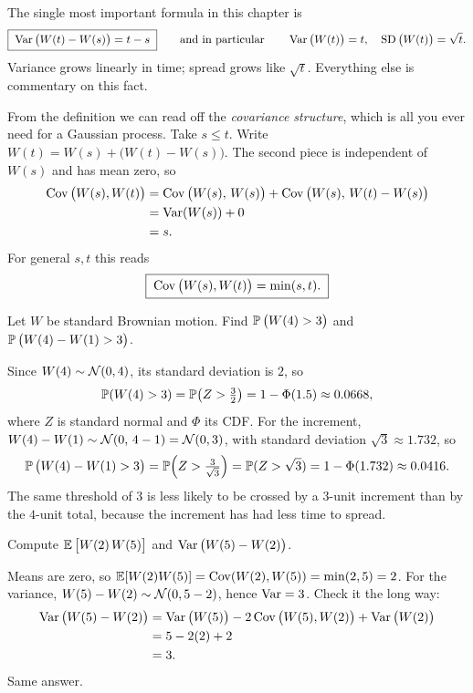 \begin{focusbox}
The single most important formula in this chapter is
\[
  \boxed{\;\Var\big(W(t)-W(s)\big) = t-s\;}\qquad\text{and in particular}\qquad
  \Var\big(W(t)\big) = t,\quad \SD\big(W(t)\big)=\sqrt t.
\]
Variance grows linearly in time; spread grows like $\sqrt t$. Everything else is
commentary on this fact.
\end{focusbox}

From the definition we can read off the \emph{covariance structure}, which is all
you ever need for a Gaussian process. Take $s\le t$. Write $W(t) = W(s) +
\big(W(t)-W(s)\big)$. The second piece is independent of $W(s)$ and has mean
zero, so
\begin{align*}
  \Cov\big(W(s),W(t)\big)
  &= \Cov\big(W(s),\,W(s)\big) + \Cov\big(W(s),\,W(t)-W(s)\big) \\
  &= \Var(W(s)) + 0 \\
  &= s.
\end{align*}
For general $s,t$ this reads
\[
  \boxed{\;\Cov\big(W(s),W(t)\big) = \min(s,t).\;}
\]

\begin{example}
\label{ch29:ex-increments}
Let $W$ be standard Brownian motion. Find $\P\big(W(4) > 3\big)$ and
$\P\big(W(4) - W(1) > 3\big)$.

Since $W(4)\sim\Normal(0,4)$, its standard deviation is $2$, so
\[
  \P(W(4)>3) = \P\!\left(Z > \tfrac{3}{2}\right) = 1-\Phi(1.5)\approx 0.0668,
\]
where $Z$ is standard normal and $\Phi$ its CDF. For the increment,
$W(4)-W(1)\sim\Normal(0,\,4-1)=\Normal(0,3)$, with standard deviation $\sqrt3
\approx 1.732$, so
\[
  \P\big(W(4)-W(1)>3\big) = \P\!\left(Z > \tfrac{3}{\sqrt3}\right)
  = \P(Z>\sqrt3) = 1-\Phi(1.732)\approx 0.0416.
\]
The same threshold of $3$ is less likely to be crossed by a $3$-unit increment
than by the $4$-unit total, because the increment has had less time to spread.
\end{example}

\begin{example}
\label{ch29:ex-cov}
Compute $\E\big[W(2)\,W(5)\big]$ and $\Var\big(W(5)-W(2)\big)$.

Means are zero, so $\E[W(2)W(5)] = \Cov(W(2),W(5)) = \min(2,5) = 2$. For the
variance, $W(5)-W(2)\sim\Normal(0,5-2)$, hence $\Var = 3$. Check it the long way:
\begin{align*}
  \Var\big(W(5)-W(2)\big) &= \Var\big(W(5)\big) - 2\Cov\big(W(5),W(2)\big) + \Var\big(W(2)\big) \\
  &= 5 - 2(2) + 2 \\
  &= 3.
\end{align*}
Same answer.
\end{example}

